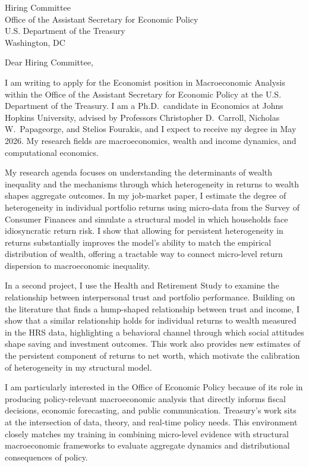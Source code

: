 \documentclass[11pt,letterpaper]{letter}
\begin{document}
\begin{letter}{Hiring Committee \\
Office of the Assistant Secretary for Economic Policy \\
U.S. Department of the Treasury \\
Washington, DC}

\opening{Dear Hiring Committee,}

I am writing to apply for the Economist position in Macroeconomic Analysis within the Office of the Assistant Secretary for Economic Policy at the U.S. Department of the Treasury. I am a Ph.D.\ candidate in Economics at Johns Hopkins University, advised by Professors Christopher D.~Carroll, Nicholas W.~Papageorge, and Stelios Fourakis, and I expect to receive my degree in May 2026. My research fields are macroeconomics, wealth and income dynamics, and computational economics.

My research agenda focuses on understanding the determinants of wealth inequality and the mechanisms through which heterogeneity in returns to wealth shapes aggregate outcomes. In my job-market paper, I estimate the degree of heterogeneity in individual portfolio returns using micro-data from the Survey of Consumer Finances and simulate a structural model in which households face idiosyncratic return risk. I show that allowing for persistent heterogeneity in returns substantially improves the model’s ability to match the empirical distribution of wealth, offering a tractable way to connect micro-level return dispersion to macroeconomic inequality.

In a second project, I use the Health and Retirement Study to examine the relationship between interpersonal trust and portfolio performance. Building on the literature that finds a hump-shaped relationship between trust and income, I show that a similar relationship holds for individual returns to wealth measured in the HRS data, highlighting a behavioral channel through which social attitudes shape saving and investment outcomes. This work also provides new estimates of the persistent component of returns to net worth, which motivate the calibration of heterogeneity in my structural model.

I am particularly interested in the Office of Economic Policy because of its role in producing policy-relevant macroeconomic analysis that directly informs fiscal decisions, economic forecasting, and public communication. Treasury’s work sits at the intersection of data, theory, and real-time policy needs. This environment closely matches my training in combining micro-level evidence with structural macroeconomic frameworks to evaluate aggregate dynamics and distributional consequences of policy.


\end{letter}
\end{document}
